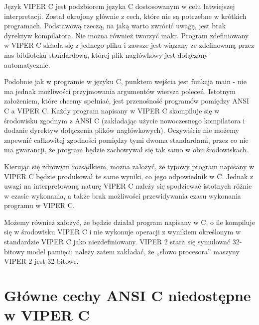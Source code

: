 \documentclass[a4paper,twoside,openright,11pt]{report}
\begin{document}
\par Język VIPER C jest podzbiorem języka C dostosowanym w celu łatwiejszej interpretacji. Został okrojony głównie z cech, które nie są potrzebne w krótkich programach. Podstawową rzeczą, na jaką warto zwrócić uwagę, jest brak dyrektyw kompilatora. Nie można również tworzyć makr. Program zdefiniowany w VIPER C składa się z jednego pliku i zawsze jest wiązany ze zdefinowaną przez nas biblioteką standardową, której plik nagłówkowy jest dołączany automatycznie. 
\par Podobnie jak w programie w języku C, punktem wejścia jest funkcja main - nie ma jednak możliwości przyjmowania argumentów wiersza poleceń. Istotnym założeniem, które chcemy spełniać, jest przenośność programów pomiędzy ANSI C a VIPER C. Każdy program napisany w VIPER C skompiluje się w środowisku zgodnym z ANSI C (zakładając użycie nowoczesnego kompilatora i dodanie dyrektyw dołączenia plików nagłówkowych). Oczywiście nie możemy zapewnić całkowitej zgodności pomiędzy tymi dwoma standardami, przez co nie ma gwarancji, że program będzie zachowywał się tak samo w obu środowiskach. \par Kierując się zdrowym rozsądkiem, można założyć, że typowy program napisany w VIPER C będzie produkował te same wyniki, co jego odpowiednik w C. Jednak z uwagi na interpretowaną naturę VIPER C należy się spodziewać istotnych różnic w czasie wykonania, a także brak możliwości przewidywania czasu wykonania programu w VIPER C. 
\par Możemy również założyć, że będzie działał program napisany w C, o ile kompiluje się w środowisku VIPER C i nie wykonuje operacji z wynikiem określonym w standardzie VIPER C jako niezdefiniowany. VIPER 2 stara się symulować 32-bitowy model pamięci; należy zatem zakładać, że „słowo procesora” maszyny VIPER 2 jest 32-bitowe. 

  \chapter {Główne cechy ANSI C niedostępne w VIPER C}
\end{document}
